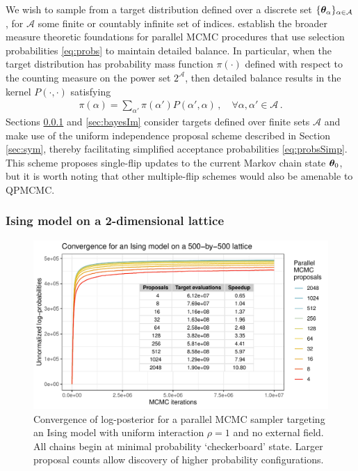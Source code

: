 \documentclass[12pt]{article} %
\begin{document}
We wish to sample from a target distribution defined over a discrete set $\{\boldsymbol{\theta}_\alpha\}_{\alpha \in \mathcal{A}}$, for $\mathcal{A}$ some finite or countably infinite set of indices.  \citet{glatt} establish the broader measure theoretic foundations for parallel MCMC procedures that use selection probabilities \eqref{eq:probs} to maintain detailed balance. In particular, when the target distribution has probability mass function $\pi(\cdot)$ defined with respect to the counting measure on the power set $2^{\mathcal{A}}$, then detailed balance results in the kernel $P(\cdot,\cdot)$  satisfying
\begin{align*}
	\pi(\alpha) = \sum_{{\alpha'}} \pi(\alpha') P(\alpha',\alpha) \, , \quad \forall \alpha,\alpha' \in \mathcal{A} \, .
\end{align*}
Sections \ref{sec:ising} and \ref{sec:bayesIm} consider targets defined over finite sets $\mathcal{A}$ and make use of the uniform independence proposal scheme described in Section \ref{sec:sym}, thereby facilitating simplified acceptance probabilities \eqref{eq:probsSimp}.  This scheme proposes single-flip updates to the current Markov chain state $\boldsymbol{\theta}_0$, but it is worth noting that other multiple-flip schemes would also be amenable to QPMCMC.


\subsubsection{Ising model on a 2-dimensional lattice}\label{sec:ising}

 \begin{figure}[!t]
	\centering
	\includegraphics[width=0.7\linewidth]{Ising2dFig.pdf}
	\caption{Convergence of log-posterior for a parallel MCMC sampler targeting an Ising model with uniform interaction $\rho=1$ and no external field. All chains begin at minimal probability `checkerboard' state. Larger proposal counts allow discovery of higher probability configurations.}\label{fig:ising2d}
\end{figure}
\end{document}
